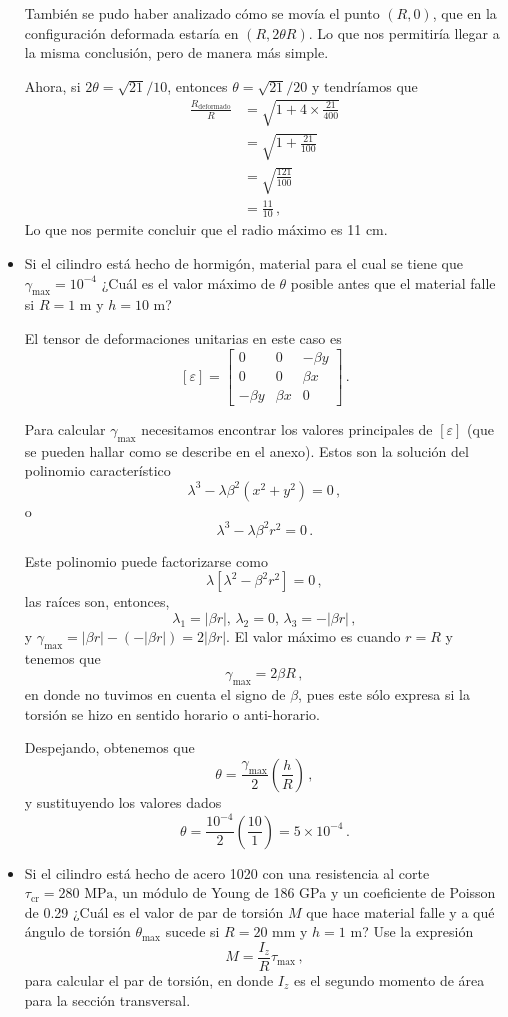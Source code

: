 \documentclass[../notas medios.tex]{subfiles}
\begin{document}
\begin{itemize}
También se pudo haber analizado cómo se movía el punto $(R, 0)$, que en la configuración deformada estaría en $(R, 2\theta R)$. Lo que nos permitiría llegar a la misma conclusión, pero de manera más simple.

Ahora, si $2\theta =\sqrt{21}/10$, entonces $\theta = \sqrt{21}/20$ y tendríamos que
\begin{align*}
  \frac{R_\text{deformado}}{R} &= \sqrt{1 + 4\times \frac{21}{400}} \\
    &= \sqrt{1 + \frac{21}{100}} \\
    &= \sqrt{\frac{121}{100}} \\
    &= \frac{11}{10}\, ,
\end{align*}
Lo que nos permite concluir que el radio máximo es 11 cm.

\item
Si el cilindro está hecho de hormigón, material para el cual se tiene que $\gamma_{\max} = 10^{-4}$ ¿Cuál es el valor máximo de $\theta$ posible antes que el material falle si $R = 1$ m y $h=10$ m?

El tensor de deformaciones unitarias en este caso es
\[[\varepsilon] =\begin{bmatrix}
	0 &0 &-\beta y\\
	0 &0 &\beta x\\
	-\beta y &\beta x &0
    \end{bmatrix}\, .
   \]
   
Para calcular $\gamma_{\max}$ necesitamos encontrar los valores principales de $[\varepsilon]$ (que se pueden hallar como se describe en el anexo). Estos son la solución del polinomio característico
\[\lambda^3 - \lambda \beta^2(x^2 + y^2) = 0\, ,\]
o
\[\lambda^3 - \lambda \beta^2 r^2 = 0\, .\]

Este polinomio puede factorizarse como
\[\lambda[\lambda^2 - \beta^2 r^2] = 0\, ,\]
las raíces son, entonces,
\[\lambda_1 = |\beta r|,\, \lambda_2 = 0,\, \lambda_3 = -|\beta r|\, ,\]
y $\gamma_{\max} = |\beta r| - (-|\beta r|) = 2|\beta r|$. El valor máximo es cuando $r=R$ y tenemos que
\[\gamma_{\max} = 2\beta R\, ,\]
en donde no tuvimos en cuenta el signo de $\beta$, pues este sólo expresa si la torsión se hizo en sentido horario o anti-horario.

Despejando, obtenemos que
\[\theta = \frac{\gamma_{\max}}{2} \left(\frac{h}{R}\right)\, ,\]
y sustituyendo los valores dados
\[\theta = \frac{10^{-4}}{2} \left(\frac{10}{1} \right) = 5\times 10^{-4} \, .\]

\item
Si el cilindro está hecho de acero 1020 con una resistencia al corte \(\tau_\text{cr} = 280 \text{ MPa}\), un módulo de Young de 186 GPa y un coeficiente de Poisson de 0.29
¿Cuál es el valor de par de torsión \(M\) que hace material falle y a qué ángulo de torsión \(\theta_{\max}\) sucede si $R = 20$ mm y $h=1$ m? Use la expresión
\[M = \frac{I_z}{R} \tau_{\max}\, ,\]
para calcular el par de torsión, en donde \(I_z\) es el segundo momento de área para la sección transversal.


\end{itemize}
\end{document}
